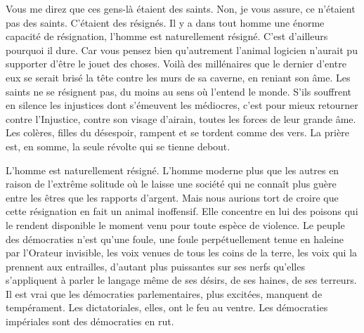 \documentclass[french,twoside]{book} %
\newcommand{\astertri}{\medskip\par\centerline{\color{rubric}\large\selectfont{\syms ✻\,✻\,✻}}\medskip\par}%
\begin{document}
\astertri

\noindent Vous me direz que ces gens-là étaient des saints. Non, je vous assure, ce n’étaient pas des saints. C’étaient des résignés. Il y a dans tout homme une énorme capacité de résignation, l’homme est naturellement résigné. C’est d’ailleurs pourquoi il dure. Car vous pensez bien qu’autrement l’animal logicien n’aurait pu supporter d’être le jouet des choses. Voilà des millénaires que le dernier d’entre eux se serait brisé la tête contre les murs de sa caverne, en reniant son âme. Les saints ne se résignent pas, du moins au sens où l’entend le monde. S’ils souffrent en silence les injustices dont s’émeuvent les médiocres, c’est pour mieux retourner contre l’Injustice, contre son visage d’airain, toutes les forces de leur grande âme. Les colères, filles du désespoir, rampent et se tordent comme des vers. La prière est, en somme, la seule révolte qui se tienne debout.\par
L’homme est naturellement résigné. L’homme moderne plus que les autres en raison de l’extrême solitude où le laisse une société qui ne connaît plus guère entre les êtres que les rapports d’argent. Mais nous aurions tort de croire que cette résignation en fait un animal inoffensif. Elle concentre en lui des poisons qui le rendent disponible le moment venu pour toute espèce de violence. Le peuple des démocraties n’est qu’une foule, une foule perpétuellement tenue en haleine par l’Orateur invisible, les voix venues de tous les coins de la terre, les voix qui la prennent aux entrailles, d’autant plus puissantes sur ses nerfs qu’elles s’appliquent à parler le langage même de ses désirs, de ses haines, de ses terreurs. Il est vrai que les démocraties parlementaires, plus excitées, manquent de tempérament. Les dictatoriales, elles, ont le feu au ventre. Les démocraties impériales sont des démocraties en rut.\par

\astertri
\end{document}

